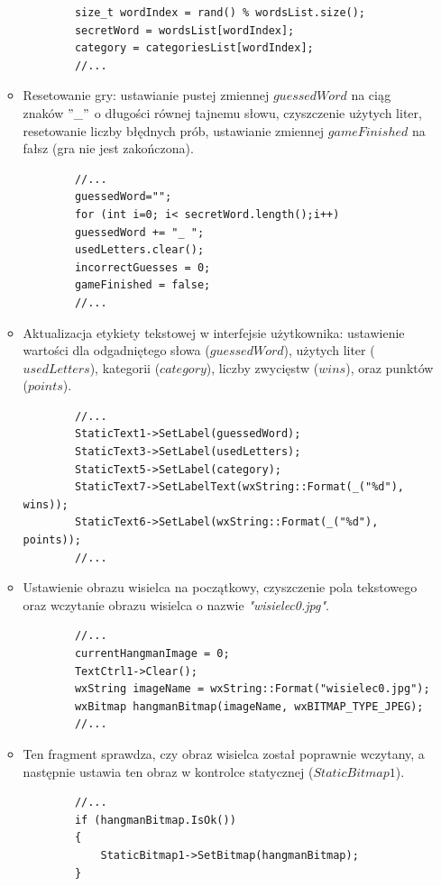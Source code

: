 \documentclass[]{report}
\begin{document}
\begin{itemize}
\begin{itemize}
\begin{lstlisting}
		size_t wordIndex = rand() % wordsList.size();
		secretWord = wordsList[wordIndex];
		category = categoriesList[wordIndex];
		//...
			\end{lstlisting}
			\item Resetowanie gry: ustawianie pustej zmiennej $guessedWord$ na ciąg znaków $"\_"$ o długości równej tajnemu słowu, czyszczenie użytych liter, resetowanie liczby błędnych prób, ustawianie zmiennej $gameFinished$ na fałsz (gra nie jest zakończona).
			\begin{lstlisting}
		//...
		guessedWord="";
		for (int i=0; i< secretWord.length();i++)
		guessedWord += "_ ";
		usedLetters.clear();
		incorrectGuesses = 0;
		gameFinished = false;
		//...
			\end{lstlisting}
			\item Aktualizacja etykiety tekstowej w interfejsie użytkownika: ustawienie wartości dla odgadniętego słowa ($guessedWord$), użytych liter ($usedLetters$), kategorii ($category$), liczby zwycięstw ($wins$), oraz punktów ($points$).
			\begin{lstlisting}
		//...
		StaticText1->SetLabel(guessedWord);
		StaticText3->SetLabel(usedLetters);
		StaticText5->SetLabel(category);
		StaticText7->SetLabelText(wxString::Format(_("%d"), wins));
		StaticText6->SetLabel(wxString::Format(_("%d"), points));
		//...
			\end{lstlisting}
			\item Ustawienie obrazu wisielca na początkowy, czyszczenie pola tekstowego oraz wczytanie obrazu wisielca o nazwie \textit{"wisielec0.jpg"}.
			\begin{lstlisting}
		//...
		currentHangmanImage = 0;
		TextCtrl1->Clear();
		wxString imageName = wxString::Format("wisielec0.jpg");
		wxBitmap hangmanBitmap(imageName, wxBITMAP_TYPE_JPEG);
		//...
			\end{lstlisting}
			\item Ten fragment sprawdza, czy obraz wisielca został poprawnie wczytany, a następnie ustawia ten obraz w kontrolce statycznej ($StaticBitmap1$).
			\begin{lstlisting}
		//...
		if (hangmanBitmap.IsOk())
		{
			StaticBitmap1->SetBitmap(hangmanBitmap);
		}
		

\end{lstlisting}
\end{itemize}
\end{itemize}
\end{document}
